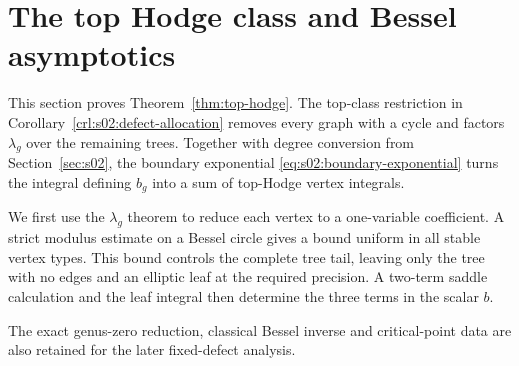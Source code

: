 \section{The top Hodge class and Bessel asymptotics}
\label{sec:s06}

This section proves Theorem~\ref{thm:top-hodge}. The top-class
restriction in Corollary~\ref{crl:s02:defect-allocation} removes
every graph with a cycle and factors $\lambda_g$ over the remaining
trees. Together with degree conversion from
Section~\ref{sec:s02}, the boundary exponential
\eqref{eq:s02:boundary-exponential} turns the integral defining $b_g$
into a sum of top-Hodge vertex integrals.

We first use the $\lambda_g$ theorem to reduce each vertex to a
one-variable coefficient. A strict modulus estimate on a Bessel
circle gives a bound uniform in all stable vertex types. This bound
controls the complete tree tail, leaving only the tree with no
edges and an elliptic leaf at the required precision. A two-term
saddle calculation and the leaf integral then determine the three
terms in the scalar $b$.

The exact genus-zero reduction, classical Bessel inverse and
critical-point data are also retained for the later fixed-defect
analysis.





